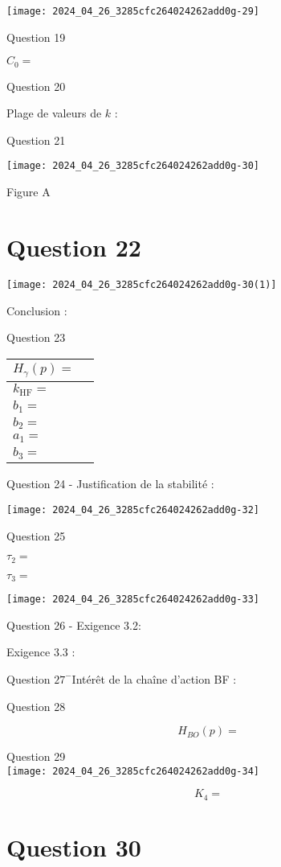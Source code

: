 \begin{center}
\texttt{[image: 2024\_04\_26\_3285cfc264024262add0g-29]}
\end{center}

Question 19

$C_{0}=$

Question 20

Plage de valeurs de $k$ :

Question 21

\begin{center}
\texttt{[image: 2024\_04\_26\_3285cfc264024262add0g-30]}
\end{center}

Figure A

\section*{Question 22}
\begin{center}
\texttt{[image: 2024\_04\_26\_3285cfc264024262add0g-30(1)]}
\end{center}

Conclusion :

Question 23

\begin{center}
\begin{tabular}{|l|l|}
\hline
$H_{\gamma}(p)=$ \\
\hline
$k_{\mathrm{HF}}=$ \\
\hline
$b_{1}=$ \\
\hline
$b_{2}=$ \\
\hline
$a_{1}=$ \\
\hline
$b_{3}=$ \\
\hline
\end{tabular}
\end{center}

Question 24 - Justification de la stabilité :

\begin{center}
\texttt{[image: 2024\_04\_26\_3285cfc264024262add0g-32]}
\end{center}

Question 25

$\tau_{2}=$

$\tau_{3}=$

\begin{center}
\texttt{[image: 2024\_04\_26\_3285cfc264024262add0g-33]}
\end{center}

Question 26 - Exigence 3.2:

Exigence 3.3 :

Question $27^{-}$Intérêt de la chaîne d'action BF :

Question 28

$$
H_{B O}(p)=
$$

Question 29\\
\texttt{[image: 2024\_04\_26\_3285cfc264024262add0g-34]}

$$
K_{4}=
$$

\section*{Question 30}

